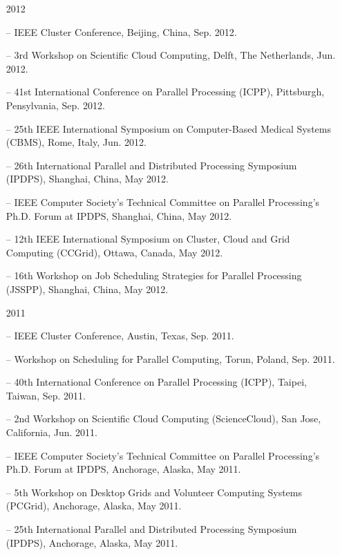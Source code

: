 \documentclass[times,11pt]{letter}
\begin{document}
\begin{itemize}
\item [2012]
\item[--]  IEEE Cluster Conference, Beijing, China, Sep. 2012.
\item[--]  3rd Workshop on Scientific Cloud Computing, Delft, The Netherlands, Jun. 2012.
\item[--]  41st  International Conference on Parallel Processing  (ICPP), Pittsburgh, Pensylvania, Sep. 2012.
\item[--]   25th IEEE International Symposium on Computer-Based Medical Systems (CBMS), Rome, Italy, Jun. 2012.
\item[--]  26th International Parallel and Distributed Processing Symposium (IPDPS), Shanghai, China, May 2012.
\item[--]  IEEE Computer Society's Technical Committee on Parallel Processing's Ph.D. Forum at IPDPS, Shanghai, China, May 2012.
\item[--]  12th IEEE International Symposium on Cluster, Cloud and Grid
Computing (CCGrid), Ottawa, Canada, May 2012.
\item[--]  16th Workshop on Job Scheduling Strategies for Parallel Processing (JSSPP),  Shanghai, China, May 2012.

\item [2011]
\item[--]  IEEE Cluster Conference, Austin, Texas, Sep. 2011.
\item[--]  Workshop on Scheduling for Parallel Computing, Torun, Poland, Sep. 2011.
\item[--]  40th International Conference on Parallel Processing (ICPP), Taipei, Taiwan, Sep. 2011.
\item[--]  2nd Workshop on Scientific Cloud Computing (ScienceCloud), San Jose, California, Jun. 2011. 
\item[--]  IEEE Computer Society's Technical Committee on Parallel Processing's Ph.D. Forum at IPDPS, Anchorage, Alaska, May 2011.
\item[--]  5th Workshop on Desktop Grids and Volunteer Computing Systems (PCGrid), Anchorage, Alaska, May 2011.
\item[--]  25th International Parallel and Distributed Processing Symposium (IPDPS), Anchorage, Alaska, May 2011.


\end{itemize}
\end{document}
